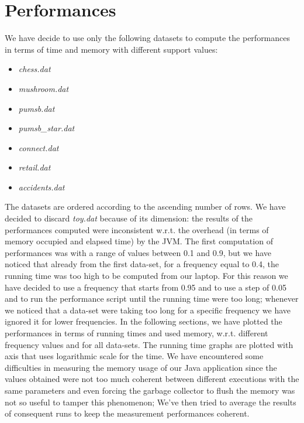 \documentclass[11pt, a4paper]{article}
\begin{document}
	\section{Performances}
		We have decide to use only the following datasets to compute the performances in terms of time and memory with different support values:
		\begin{itemize}
			\item \textit{chess.dat}
			\item \textit{mushroom.dat}
			\item \textit{pumsb.dat}
			\item \textit{pumsb\_star.dat}
			\item \textit{connect.dat}
			\item \textit{retail.dat}
			\item \textit{accidents.dat}
		\end{itemize}
		The datasets are ordered according to the ascending number of rows.
		\newline\noindent
		We have decided to discard \textit{toy.dat} because of its dimension: the results of the performances computed were inconsistent w.r.t. the overhead (in terms of memory occupied and elapsed time) by the JVM.
		\newline\newline
		\noindent
		The first computation of performances was with a range of values between 0.1 and 0.9, but we have noticed that already from the first data-set, for a frequency equal to 0.4, the running time was too high to be computed from our laptop.\newline
		For this reason we have decided to use a frequency that starts from 0.95 and to use a step of 0.05 and to run the performance script until the running time were too long; whenever we noticed that a data-set were taking too long for a specific frequency we have ignored it for lower frequencies.
		In the following sections, we have plotted the performances in terms of running times and used memory, w.r.t. different frequency values and for all data-sets. The running time graphs are plotted with axis that uses  logarithmic scale for the time.
		We have encountered some difficulties in measuring the memory usage of our Java application since the values obtained were not too much coherent between different executions with the same parameters and even forcing the garbage collector to flush the memory was not so useful to tamper this phenomenon; We've then tried to average the results of consequent runs to keep the measurement performances coherent.
\end{document}

